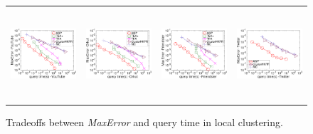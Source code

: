 \begin{figure}[t]
	\begin{small}
		\centering
		\begin{tabular}{cccc}
			\hspace{-4mm} \includegraphics[height=34mm]{./Figs/HKPR-maxerr-query-YT.eps} &
			\hspace{-4mm} \includegraphics[height=34mm]{./Figs/HKPR-maxerr-query-OL.eps} &
			\hspace{-4mm} \includegraphics[height=34mm]{./Figs/HKPR-maxerr-query-FR.eps} &
			\hspace{-4mm} \includegraphics[height=34mm]{./Figs/HKPR-maxerr-query-TW.eps} 
		\end{tabular}
		\vspace{-5mm}
		\caption{Tradeoffs between {\em MaxError} and query time in local clustering.}
		\label{fig:HKPR-maxerror-query}
		\vspace{-2mm}
	\end{small}
\end{figure}

